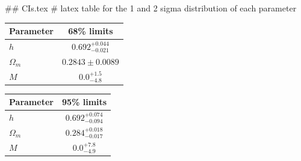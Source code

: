 ## CIs.tex
# latex table for the 1 and 2 sigma distribution of each parameter

\begin{tabular} { l  c}
 Parameter &  68\% limits\\
\hline
{\boldmath$h              $} & $0.692^{+0.044}_{-0.021}   $\\
{\boldmath$\Omega_m       $} & $0.2843\pm 0.0089          $\\
{\boldmath$M              $} & $0.0^{+1.5}_{-4.8}         $\\
\hline
\end{tabular}

\begin{tabular} { l  c}
 Parameter &  95\% limits\\
\hline
{\boldmath$h              $} & $0.692^{+0.074}_{-0.094}   $\\
{\boldmath$\Omega_m       $} & $0.284^{+0.018}_{-0.017}   $\\
{\boldmath$M              $} & $0.0^{+7.8}_{-4.9}         $\\
\hline
\end{tabular}
